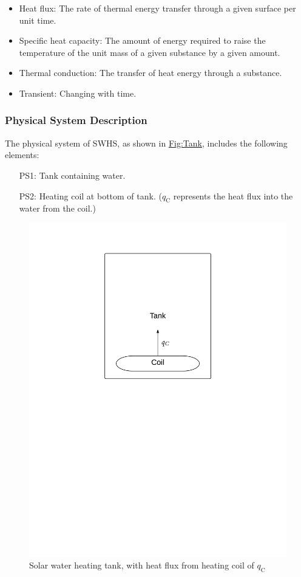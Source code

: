 \documentclass[12pt]{article}
\begin{document}
\begin{itemize}
\item{Heat flux: The rate of thermal energy transfer through a given surface per unit time.}
\item{Specific heat capacity: The amount of energy required to raise the temperature of the unit mass of a given substance by a given amount.}
\item{Thermal conduction: The transfer of heat energy through a substance.}
\item{Transient: Changing with time.}
\end{itemize}
\subsubsection{Physical System Description}
\label{Sec:PhysSyst}
The physical system of SWHS, as shown in \hyperref[Figure:Tank]{Fig:Tank}, includes the following elements:

\begin{itemize}
\item[PS1:]{Tank containing water.}
\item[PS2:]{Heating coil at bottom of tank. (${q_{\text{C}}}$ represents the heat flux into the water from the coil.)}
\end{itemize}
\begin{figure}
\begin{center}
\includegraphics[width=\textwidth]{../../../../datafiles/nopcm/TankWaterOnly.png}
\caption{Solar water heating tank, with heat flux from heating coil of ${q_{\text{C}}}$}
\label{Figure:Tank}
\end{center}
\end{figure}
\end{document}
